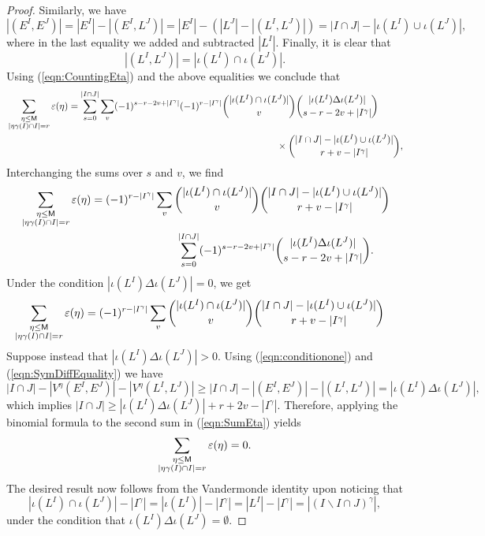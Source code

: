 \documentclass[11pt, a4paper, oneside, reqno]{amsart}
\theoremstyle{remark}
\theoremstyle{definition}
\numberwithin{equation}{section}
\begin{document}
\begin{proof}
    Similarly, we have
    $$
    |(E^I,E^J)| = |E^I|-|(E^I,L^J)|= |E^I| - (|L^J|-|(L^I,L^J)|)  = |I\cap J| - |\iota(L^I) \cup \iota(L^J)|,
    $$
    where in the last equality we added and subtracted $|L^I|$.
    Finally, it is clear that
    $$
|(L^I,L^J)| = |\iota(L^I) \cap \iota (L^J)|.
    $$
    Using (\ref{eqn:CountingEta}) and the above equalities we conclude that
    \begin{align*}
		 & \sum_{\substack{\eta \leq {\sf M}                                                                                         \\ |\eta\gamma(I)\cap I|=r}}\varepsilon(\eta)= \sum_{s=0}^{|I\cap J|}\sum_v (-1)^{s-r-2v+|I^{\gamma}|}(-1)^{r-|I^{\gamma}|}
		  \binom{|\iota(L^I)\cap \iota(L^J)|}{v}\binom{|\iota(L^I) \Delta \iota(L^J)|}{s-r-2v+|I^{\gamma}|}  \\
		&\hspace{10cm}\times\binom{|I\cap J|-|\iota(L^I)\cup \iota(L^J)|}{r+ v-|I^{\gamma}|} ,
	\end{align*}
	Interchanging the sums over $s$ and $v$, we find
	\begin{align}
    \label{eqn:SumEta}
		 & \sum_{\substack{\eta \leq {\sf M}                                                                                        \nonumber\\ |\eta\gamma(I)\cap I|=r}}\varepsilon(\eta)= (-1)^{r-|I^{\gamma}|}\sum_v \binom{|\iota(L^I)\cap \iota(L^J)|}{v}\binom{|I\cap J|-|\iota(L^I)\cup \iota(L^J)|}{r+ v-|I^{\gamma}|}\\
		 & \hspace{5cm} \sum_{s=0}^{|I\cap J|} (-1)^{s-r-2v+|I^{\gamma}|}\binom{|\iota(L^I) \Delta \iota(L^J)|}{s-r-2v+|I^{\gamma}|}.
    \end{align}
     Under the condition $|\iota(L^I) \Delta \iota(L^J)|=0$, we get
	\begin{align*}
		\sum_{\substack{\eta \leq {\sf M} \\ |\eta\gamma(I)\cap I|=r}}\varepsilon(\eta)&= (-1)^{r-|I^{\gamma}|}\sum_v \binom{|\iota(L^I)\cap \iota(L^J)|}{v}\binom{|I\cap J|-|\iota(L^I)\cup \iota(L^J)|}{r+ v-|I^{\gamma}|}
	\end{align*}
    Suppose instead that $|\iota(L^I) \Delta \iota(L^J)|>0$. Using (\ref{eqn:conditionone}) and (\ref{eqn:SymDiffEquality}) we have 
    $$
    |I\cap J| -|V^\eta(E^I,E^J)|-|V^\eta(L^I,L^J)| \geq |I\cap J|- |(E^I,E^J)|- |(L^I,L^J)|= |\iota(L^I)\Delta \iota(L^J)|,
    $$
    which implies $|I\cap J|\geq |\iota(L^I) \Delta \iota(L^J)|+r+2v-|I^\gamma|$. Therefore, applying the binomial formula to the second sum in (\ref{eqn:SumEta}) yields
    $$
    \sum_{\substack{\eta \leq {\sf M} \\ |\eta\gamma(I)\cap I|=r}}\varepsilon(\eta) = 0.
    $$
    The desired result now follows from the Vandermonde identity upon noticing that
	$$
		|\iota(L^I)\cap \iota(L^J)|-|I^{\gamma}| =
		|\iota(L^I)|-|I^{\gamma}| = |L^I|-|I^{\gamma}| = |(I\backslash I\cap J)^{\gamma}|,
	$$
	under the condition that $\iota(L^I)\Delta \iota(L^J)=\emptyset$.
    
\end{proof}
\end{document}
